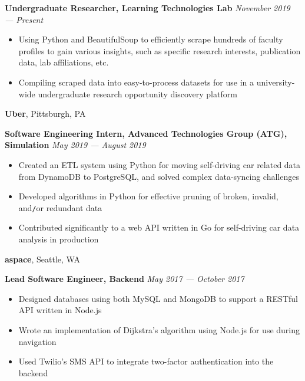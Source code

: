 \documentclass[10pt]{article}
\begin{document}
\begin{flushleft}
		\begin{leftli}
			{\small \textbf{Undergraduate Researcher, Learning Technologies Lab}} \hfill \textit{\small November 2019 --- Present}
			\begin{itemize}
				\item Using Python and BeautifulSoup to efficiently scrape hundreds of faculty profiles to gain various insights, such as specific research interests, publication data, lab affiliations, etc.
				\vspace{-2mm}
				\item Compiling scraped data into easy-to-process datasets for use in a university-wide undergraduate research opportunity discovery platform
			\end{itemize}
		\end{leftli}

		\vspace{-1.50mm}
		\textbf{Uber}, Pittsburgh, PA\\
		\begin{leftli}
			{\small \textbf{Software Engineering Intern, Advanced Technologies Group (ATG), Simulation}} \hfill \textit{\small May 2019 --- August 2019}
			\begin{itemize}
				\item Created an ETL system using Python for moving self-driving car related data from DynamoDB to PostgreSQL, and solved complex data-syncing challenges
				\vspace{-2mm}
				\item Developed algorithms in Python for effective pruning of broken, invalid, and\texttt{/}or redundant data
				\vspace{-2mm}
				\item Contributed significantly to a web API written in Go for self-driving car data analysis in production
			\end{itemize}
		\end{leftli}

		\vspace{-1.50mm}
		\textbf{aspace}, Seattle, WA\\
		\begin{leftli}
			{\small \textbf{Lead Software Engineer, Backend} \hfill \textit{May 2017 --- October 2017}}

			\begin{itemize}
				\item Designed databases using both MySQL and MongoDB to support a RESTful API written in Node.js
				\vspace{-2mm}
				\item Wrote an implementation of Dijkstra's algorithm using Node.js for use during navigation
				\vspace{-2mm}
				\item Used Twilio's SMS API to integrate two-factor authentication into the backend
			\end{itemize}
		\end{leftli}


\end{flushleft}
\end{document}
